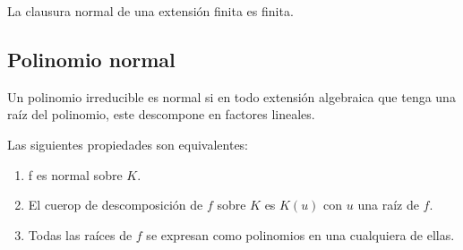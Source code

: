 \begin{proposition}
La clausura normal de una extensión finita es finita. 
\end{proposition}

\subsection{Polinomio normal}

\begin{definition}
Un polinomio irreducible es normal si en todo extensión algebraica que tenga una raíz del polinomio, este descompone en factores lineales. 
\end{definition}

\begin{proposition}
Las siguientes propiedades son equivalentes:

\begin{enumerate}
\item f es normal sobre $K$.
\item El cuerop de descomposición de $f$ sobre $K$ es $K(u)$ con $u$ una raíz de $f$. 
\item Todas las raíces de $f$ se expresan como polinomios en una cualquiera de ellas. 
\end{enumerate}
\end{proposition}

